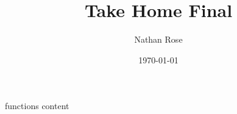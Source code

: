 \documentclass[11pt]{article}
\title{Take Home Final}
\author{Nathan Rose}
\date{\today}
\begin{document}
\maketitle
{functions}
{content}
\end{document}
